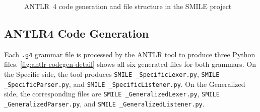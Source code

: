 \begin{figure}[t!]
      \caption{ANTLR~4 code generation and file structure in the SMILE  project}
      \label{fig:antlr-files}
  \end{figure}


  \subsection{ANTLR4 Code Generation}\label{subsec:antlr-codegen}

  Each \texttt{.g4} grammar file is processed by the ANTLR tool to produce three Python files. \autoref{fig:antlr-codegen-detail} shows all six generated files for both
  grammars. On the Specific side, the tool produces \texttt{SMILE \_SpecificLexer.py}, \texttt{SMILE \_SpecificParser.py}, and \texttt{SMILE \_SpecificListener.py}. On the
  Generalized side, the corresponding files are \texttt{SMILE \_GeneralizedLexer.py}, \texttt{SMILE \_GeneralizedParser.py}, and \texttt{SMILE \_GeneralizedListener.py}.

